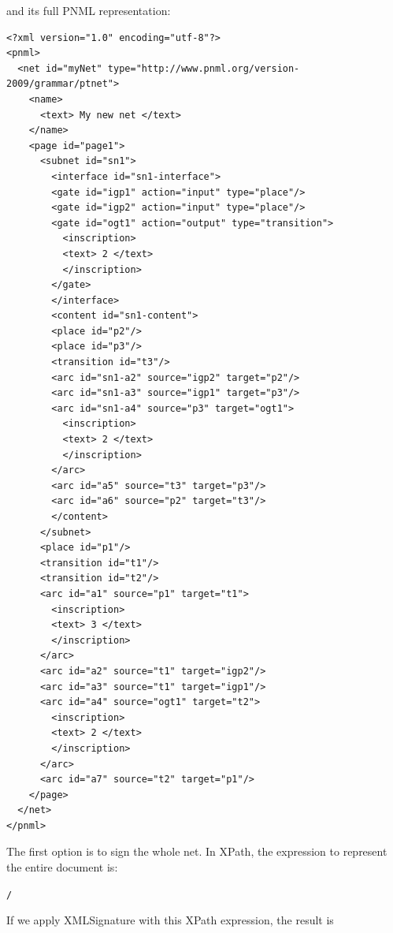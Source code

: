 and its full PNML representation:

\begin{lstlisting}
<?xml version="1.0" encoding="utf-8"?>
<pnml>
  <net id="myNet" type="http://www.pnml.org/version-2009/grammar/ptnet">
    <name>
      <text> My new net </text>
    </name>
    <page id="page1">
      <subnet id="sn1">
        <interface id="sn1-interface">
        <gate id="igp1" action="input" type="place"/>
        <gate id="igp2" action="input" type="place"/>
        <gate id="ogt1" action="output" type="transition">
          <inscription>
          <text> 2 </text>
          </inscription>
        </gate>
        </interface>
        <content id="sn1-content">
        <place id="p2"/>
        <place id="p3"/>
        <transition id="t3"/>
        <arc id="sn1-a2" source="igp2" target="p2"/>
        <arc id="sn1-a3" source="igp1" target="p3"/>
        <arc id="sn1-a4" source="p3" target="ogt1">
          <inscription>
          <text> 2 </text>
          </inscription>
        </arc>
        <arc id="a5" source="t3" target="p3"/>
        <arc id="a6" source="p2" target="t3"/>
        </content>
      </subnet>
      <place id="p1"/>
      <transition id="t1"/>
      <transition id="t2"/>
      <arc id="a1" source="p1" target="t1">
        <inscription>
        <text> 3 </text>
        </inscription>
      </arc>
      <arc id="a2" source="t1" target="igp2"/>
      <arc id="a3" source="t1" target="igp1"/>
      <arc id="a4" source="ogt1" target="t2">
        <inscription>
        <text> 2 </text>
        </inscription>
      </arc>
      <arc id="a7" source="t2" target="p1"/>
    </page>
  </net>
</pnml>
\end{lstlisting}

The first option is to sign the whole net. In XPath, the expression to represent
the entire document is:
\begin{alltt}
    /
\end{alltt}

If we apply XMLSignature with this XPath expression, the result is


